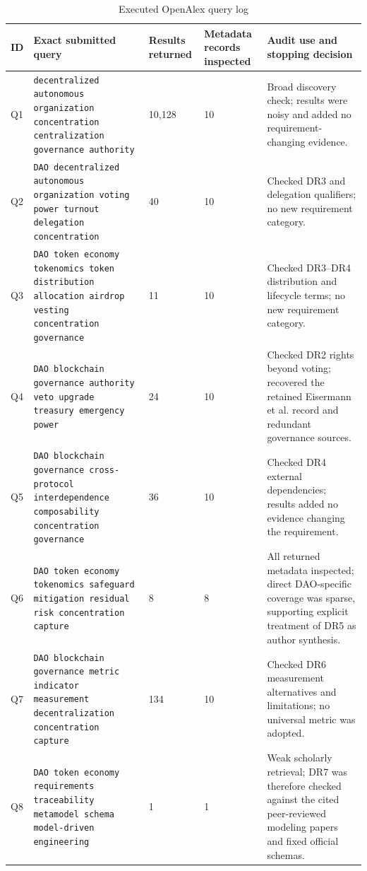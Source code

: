 \documentclass[10pt]{article}
\begin{document}
\begin{landscape}
\begin{table}[h]
\caption{Executed OpenAlex query log}
\centering
\scriptsize
\begin{tabularx}{\linewidth}{@{}p{.04\linewidth}p{.48\linewidth}p{.08\linewidth}p{.08\linewidth}Y@{}}
\toprule
ID & Exact submitted query & Results returned & Metadata records inspected & Audit use and stopping decision \\
\midrule
Q1 & \texttt{decentralized autonomous organization concentration centralization governance authority} & 10,128 & 10 & Broad discovery check; results were noisy and added no requirement-changing evidence. \\
Q2 & \texttt{DAO decentralized autonomous organization voting power turnout delegation concentration} & 40 & 10 & Checked DR3 and delegation qualifiers; no new requirement category. \\
Q3 & \texttt{DAO token economy tokenomics token distribution allocation airdrop vesting concentration governance} & 11 & 10 & Checked DR3--DR4 distribution and lifecycle terms; no new requirement category. \\
Q4 & \texttt{DAO blockchain governance authority veto upgrade treasury emergency power} & 24 & 10 & Checked DR2 rights beyond voting; recovered the retained Eisermann et al. record and redundant governance sources. \\
Q5 & \texttt{DAO blockchain governance cross-protocol interdependence composability concentration governance} & 36 & 10 & Checked DR4 external dependencies; results added no evidence changing the requirement. \\
Q6 & \texttt{DAO token economy tokenomics safeguard mitigation residual risk concentration capture} & 8 & 8 & All returned metadata inspected; direct DAO-specific coverage was sparse, supporting explicit treatment of DR5 as author synthesis. \\
Q7 & \texttt{DAO blockchain governance metric indicator measurement decentralization concentration capture} & 134 & 10 & Checked DR6 measurement alternatives and limitations; no universal metric was adopted. \\
Q8 & \texttt{DAO token economy requirements traceability metamodel schema model-driven engineering} & 1 & 1 & Weak scholarly retrieval; DR7 was therefore checked against the cited peer-reviewed modeling papers and fixed official schemas. \\
\bottomrule
\end{tabularx}
\end{table}
\end{landscape}
\end{document}
